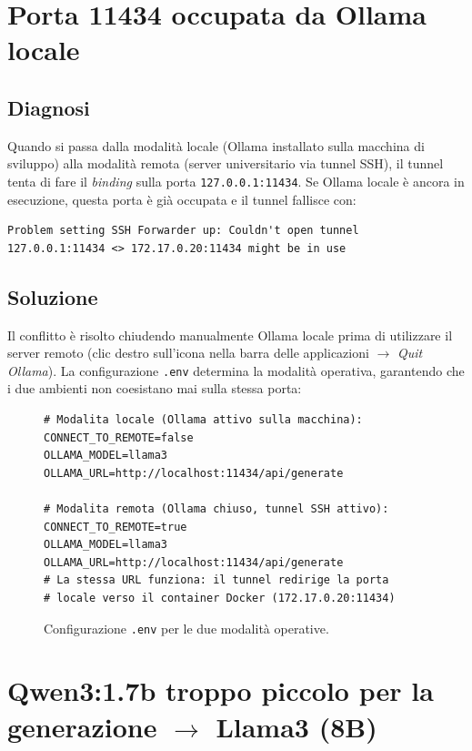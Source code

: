 \documentclass[11pt]{report}
\begin{document}
 
\section{Porta 11434 occupata da Ollama locale}
 
\subsection*{Diagnosi}
Quando si passa dalla modalità locale (Ollama installato sulla macchina di sviluppo) alla modalità remota (server universitario via tunnel SSH), il tunnel tenta di fare il \textit{binding} sulla porta \texttt{127.0.0.1:11434}. Se Ollama locale è ancora in esecuzione, questa porta è già occupata e il tunnel fallisce con:
 
\begin{verbatim}
Problem setting SSH Forwarder up: Couldn't open tunnel 
127.0.0.1:11434 <> 172.17.0.20:11434 might be in use
\end{verbatim}
 
\subsection*{Soluzione}
Il conflitto è risolto chiudendo manualmente Ollama locale prima di utilizzare il server remoto (clic destro sull'icona nella barra delle applicazioni $\rightarrow$ \textit{Quit Ollama}). La configurazione \texttt{.env} determina la modalità operativa, garantendo che i due ambienti non coesistano mai sulla stessa porta:
 
\begin{figure}[H]
\begin{verbatim}
# Modalita locale (Ollama attivo sulla macchina):
CONNECT_TO_REMOTE=false
OLLAMA_MODEL=llama3
OLLAMA_URL=http://localhost:11434/api/generate
 
# Modalita remota (Ollama chiuso, tunnel SSH attivo):
CONNECT_TO_REMOTE=true
OLLAMA_MODEL=llama3
OLLAMA_URL=http://localhost:11434/api/generate
# La stessa URL funziona: il tunnel redirige la porta
# locale verso il container Docker (172.17.0.20:11434)
\end{verbatim}
\caption{Configurazione \texttt{.env} per le due modalità operative.}
\end{figure}
 
 
\section{Qwen3:1.7b troppo piccolo per la generazione $\rightarrow$ Llama3 (8B)}
 
\end{document}
